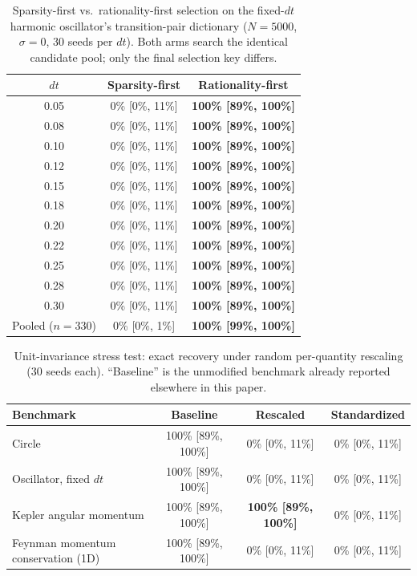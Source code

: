 \documentclass{article}
\begin{document}
\begin{table}[ht]
\centering
\caption{Sparsity-first vs.\ rationality-first selection on the fixed-$dt$ harmonic oscillator's transition-pair dictionary ($N=5000$, $\sigma=0$, 30 seeds per $dt$). Both arms search the identical candidate pool; only the final selection key differs.}
\label{tab:sparsity-vs-rationality}
\begin{tabular}{c c c}
\toprule
$dt$ & \textbf{Sparsity-first} & \textbf{Rationality-first}\\
\midrule
0.05 & 0\% [0\%, 11\%] & \textbf{100\% [89\%, 100\%]}\\
0.08 & 0\% [0\%, 11\%] & \textbf{100\% [89\%, 100\%]}\\
0.10 & 0\% [0\%, 11\%] & \textbf{100\% [89\%, 100\%]}\\
0.12 & 0\% [0\%, 11\%] & \textbf{100\% [89\%, 100\%]}\\
0.15 & 0\% [0\%, 11\%] & \textbf{100\% [89\%, 100\%]}\\
0.18 & 0\% [0\%, 11\%] & \textbf{100\% [89\%, 100\%]}\\
0.20 & 0\% [0\%, 11\%] & \textbf{100\% [89\%, 100\%]}\\
0.22 & 0\% [0\%, 11\%] & \textbf{100\% [89\%, 100\%]}\\
0.25 & 0\% [0\%, 11\%] & \textbf{100\% [89\%, 100\%]}\\
0.28 & 0\% [0\%, 11\%] & \textbf{100\% [89\%, 100\%]}\\
0.30 & 0\% [0\%, 11\%] & \textbf{100\% [89\%, 100\%]}\\
\midrule
Pooled ($n=330$) & 0\% [0\%, 1\%] & \textbf{100\% [99\%, 100\%]}\\
\bottomrule
\end{tabular}
\end{table}


\begin{table}[H]
\centering
\caption{Unit-invariance stress test: exact recovery under random per-quantity rescaling (30 seeds each). ``Baseline'' is the unmodified benchmark already reported elsewhere in this paper.}
\label{tab:eunit}
\begin{tabular}{lccc}
\toprule
\textbf{Benchmark} & \textbf{Baseline} & \textbf{Rescaled} & \textbf{Standardized}\\
\midrule
Circle & 100\% [89\%, 100\%] & 0\% [0\%, 11\%] & 0\% [0\%, 11\%]\\
Oscillator, fixed $dt$ & 100\% [89\%, 100\%] & 0\% [0\%, 11\%] & 0\% [0\%, 11\%]\\
Kepler angular momentum & 100\% [89\%, 100\%] & \textbf{100\% [89\%, 100\%]} & 0\% [0\%, 11\%]\\
Feynman momentum conservation (1D) & 100\% [89\%, 100\%] & 0\% [0\%, 11\%] & 0\% [0\%, 11\%]\\
\bottomrule
\end{tabular}
\end{table}
\end{document}
